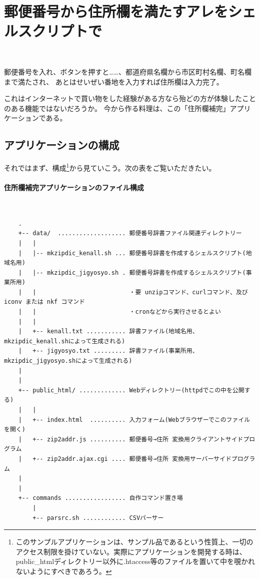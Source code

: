 \section*{郵便番号から住所欄を満たすアレをシェルスクリプトで}

\noindent
$\!\!\!\!\!$
\begin{grshfboxit}{160.0mm}
	郵便番号を入れ、ボタンを押すと……、都道府県名欄から市区町村名欄、町名欄まで満たされ、
	あとはせいぜい番地を入力すれば住所欄は入力完了。
\end{grshfboxit}

これはインターネットで買い物をした経験がある方なら殆どの方が体験したことのある機能ではないだろうか。
今から作る料理は、この「住所欄補完」アプリケーションである。

\subsection*{アプリケーションの構成}

それではまず、構成\footnote{このサンプルアプリケーションは、サンプル品であるという性質上、一切のアクセス制限を掛けていない。実際にアプリケーションを開発する時は、public\_{}htmlディレクトリー以外に.htaccess等のファイルを置いて中を覗かれないようにすべきであろう。}から見ていこう。次の表をご覧いただきたい。

\paragraph{住所欄補完アプリケーションのファイル構成} 　\\
\begin{frameboxit}{160.0mm}
\begin{verbatim}
	.
	+-- data/  ................... 郵便番号辞書ファイル関連ディレクトリー
	|   |
	|   |-- mkzipdic_kenall.sh ... 郵便番号辞書を作成するシェルスクリプト(地域名用)
	|   |-- mkzipdic_jigyosyo.sh . 郵便番号辞書を作成するシェルスクリプト(事業所用)
	|   |                          ・要 unzipコマンド、curlコマンド、及び iconv または nkf コマンド
	|   |                          ・cronなどから実行させるとよい
	|   |
	|   +-- kenall.txt ........... 辞書ファイル(地域名用、mkzipdic_kenall.shによって生成される)
	|   +-- jigyosyo.txt ......... 辞書ファイル(事業所用、mkzipdic_jigyosyo.shによって生成される)
	|
	|
	+-- public_html/ ............. Webディレクトリー(httpdでこの中を公開する)
	|   |
	|   +-- index.html  .......... 入力フォーム(Webブラウザーでこのファイルを開く)
	|   +-- zip2addr.js .......... 郵便番号→住所 変換用クライアントサイドプログラム
	|   +-- zip2addr.ajax.cgi .... 郵便番号→住所 変換用サーバーサイドプログラム
	|
	|
	+-- commands ................. 自作コマンド置き場
	    |
	    +-- parsrc.sh ............ CSVパーサー
\end{verbatim}
\end{frameboxit}

